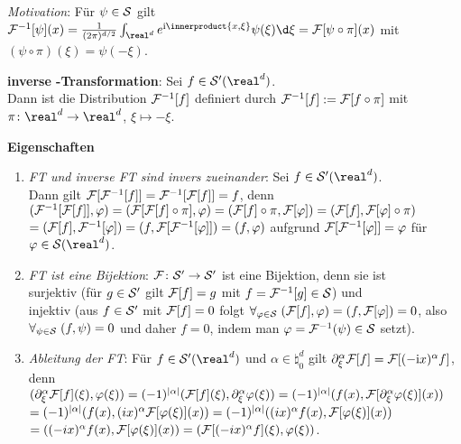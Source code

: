 \linie

\emph{Motivation}:
Für $\psi \in \S$ gilt $\F^{-1}[\psi](x) =
\frac{1}{(2\pi)^{d/2}} \int_{\real^d} e^{\i\innerproduct{x, \xi}}\psi(\xi)\d\xi =
\F[\psi \circ \pi](x)$ mit\\
$(\psi \circ \pi)(\xi) = \psi(-\xi)$.

\textbf{inverse -Transformation}:
Sei $f \in \S'(\real^d)$.\\
Dann ist die Distribution $\F^{-1}[f]$ definiert durch
$\F^{-1}[f] := \F[f \circ \pi]$ mit $\pi\colon \real^d \rightarrow \real^d$,
$\xi \mapsto -\xi$.

\linie

\textbf{Eigenschaften}
\begin{enumerate}
    \item
    \emph{FT und inverse FT sind invers zueinander}:
    Sei $f \in \S'(\real^d)$.\\
    Dann gilt $\F[\F^{-1}[f]] = \F^{-1}[\F[f]] = f$, denn\\
    $(\F^{-1}[\F[f]], \varphi) =
    (\F[\F[f] \circ \pi], \varphi) =
    (\F[f] \circ \pi, \F[\varphi]) =
    (\F[f], \F[\varphi] \circ \pi)$\\
    $= (\F[f], \F^{-1}[\varphi]) =
    (f, \F[\F^{-1}[\varphi]]) =
    (f, \varphi)$
    aufgrund $\F[\F^{-1}[\varphi]] = \varphi$ für $\varphi \in \S(\real^d)$.

    \item
    \emph{FT ist eine Bijektion}:
    $\F\colon \S' \rightarrow \S'$ ist eine Bijektion, denn sie ist\\
    surjektiv
    (für $g \in \S'$ gilt $\F[f] = g$ mit $f = \F^{-1}[g] \in \S$) und\\
    injektiv
    (aus $f \in \S'$ mit $\F[f] = 0$ folgt
    $\forall_{\varphi \in \S}\; (\F[f], \varphi) = (f, \F[\varphi]) = 0$,
    also\\
    $\forall_{\psi \in \S}\; (f, \psi) = 0$ und daher $f = 0$,
    indem man $\varphi = \F^{-1}(\psi) \in \S$ setzt).

    \item
    \emph{Ableitung der FT}:
    Für $f \in \S'(\real^d)$ und $\alpha \in \natural_0^d$ gilt
    $\partial_\xi^\alpha \F[f] = \F[(-\i x)^\alpha f]$, denn\\
    $(\partial_\xi^\alpha \F[f](\xi), \varphi(\xi)) =
    (-1)^{|\alpha|} (\F[f](\xi), \partial_\xi^\alpha \varphi(\xi)) =
    (-1)^{|\alpha|} (f(x), \F[\partial_\xi^\alpha \varphi(\xi)](x))$\\
    $= (-1)^{|\alpha|} (f(x), (ix)^\alpha \F[\varphi(\xi)](x)) =
    (-1)^{|\alpha|} ((ix)^\alpha f(x), \F[\varphi(\xi)](x))$\\
    $= ((-ix)^\alpha f(x), \F[\varphi(\xi)](x)) =
    (\F[(-ix)^\alpha f](\xi), \varphi(\xi))$.


\end{enumerate}
